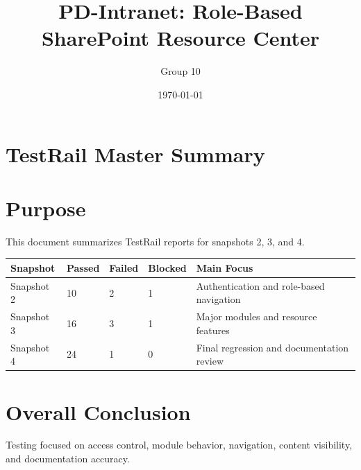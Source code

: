 \documentclass[12pt]{article}
\title{PD-Intranet: Role-Based SharePoint Resource Center}
\author{Group 10}
\date{\today}
\begin{document}
\maketitle
\tableofcontents
\newpage

\section{TestRail Master Summary}
\section{Purpose}
This document summarizes TestRail reports for snapshots 2, 3, and 4.

\begin{longtable}{|p{1.2in}|p{1.2in}|p{1.2in}|p{1.2in}|p{1.8in}|}\hline
Snapshot & Passed & Failed & Blocked & Main Focus \\ \hline
Snapshot 2 & 10 & 2 & 1 & Authentication and role-based navigation \\ \hline
Snapshot 3 & 16 & 3 & 1 & Major modules and resource features \\ \hline
Snapshot 4 & 24 & 1 & 0 & Final regression and documentation review \\ \hline
\end{longtable}

\section{Overall Conclusion}
Testing focused on access control, module behavior, navigation, content visibility, and documentation accuracy.
\end{document}
